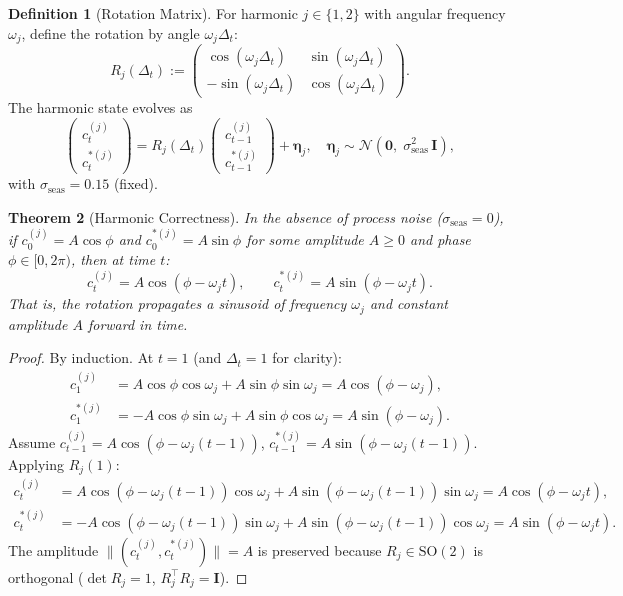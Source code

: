 \documentclass[11pt, a4paper]{article}
\theoremstyle{plain}
\newtheorem{theorem}{Theorem}[section]
\theoremstyle{definition}
\newtheorem{definition}[theorem]{Definition}
\newcommand{\N}{\mathcal{N}}
\begin{document}
\begin{definition}[Rotation Matrix]
For harmonic $j \in \{1, 2\}$ with angular frequency $\omega_j$, define
the rotation by angle $\omega_j \Delta_t$:
\[
  R_j(\Delta_t) :=
  \begin{pmatrix}
    \cos(\omega_j \Delta_t) &  \sin(\omega_j \Delta_t)\\
   -\sin(\omega_j \Delta_t) &  \cos(\omega_j \Delta_t)
  \end{pmatrix}.
\]
The harmonic state evolves as
\begin{equation}
  \begin{pmatrix} c_t^{(j)} \\ c_t^{*(j)} \end{pmatrix}
  = R_j(\Delta_t)
  \begin{pmatrix} c_{t-1}^{(j)} \\ c_{t-1}^{*(j)} \end{pmatrix}
  + \boldsymbol\eta_j,
  \quad \boldsymbol\eta_j \sim \N(\mathbf{0},\; \sigma_{\mathrm{seas}}^2\,\mathbf{I}),
  \label{eq:harmonic}
\end{equation}
with $\sigma_{\mathrm{seas}} = 0.15$ (fixed).
\end{definition}

\begin{theorem}[Harmonic Correctness]\label{thm:harmonic}
In the absence of process noise ($\sigma_{\mathrm{seas}} = 0$), if
$c_0^{(j)} = A\cos\phi$ and $c_0^{*(j)} = A\sin\phi$ for some amplitude
$A \geq 0$ and phase $\phi \in [0, 2\pi)$, then at time $t$:
\[
  c_t^{(j)} = A\cos(\phi - \omega_j t),
  \qquad
  c_t^{*(j)} = A\sin(\phi - \omega_j t).
\]
That is, the rotation propagates a sinusoid of frequency $\omega_j$ and
constant amplitude $A$ forward in time.
\end{theorem}
\begin{proof}
By induction. At $t=1$ (and $\Delta_t = 1$ for clarity):
\begin{align*}
  c_1^{(j)} &= A\cos\phi\cos\omega_j + A\sin\phi\sin\omega_j
             = A\cos(\phi - \omega_j),\\
  c_1^{*(j)} &= -A\cos\phi\sin\omega_j + A\sin\phi\cos\omega_j
              = A\sin(\phi - \omega_j).
\end{align*}
Assume $c_{t-1}^{(j)} = A\cos(\phi - \omega_j(t-1))$,
$c_{t-1}^{*(j)} = A\sin(\phi - \omega_j(t-1))$. Applying $R_j(1)$:
\begin{align*}
  c_t^{(j)} &= A\cos(\phi{-}\omega_j(t{-}1))\cos\omega_j
              + A\sin(\phi{-}\omega_j(t{-}1))\sin\omega_j
             = A\cos(\phi - \omega_j t),\\
  c_t^{*(j)} &= -A\cos(\phi{-}\omega_j(t{-}1))\sin\omega_j
              + A\sin(\phi{-}\omega_j(t{-}1))\cos\omega_j
             = A\sin(\phi - \omega_j t).
\end{align*}
The amplitude $\|(c_t^{(j)}, c_t^{*(j)})\| = A$ is preserved because
$R_j \in \mathrm{SO}(2)$ is orthogonal ($\det R_j = 1$,
$R_j^\top R_j = \mathbf{I}$).
\end{proof}
\end{document}
